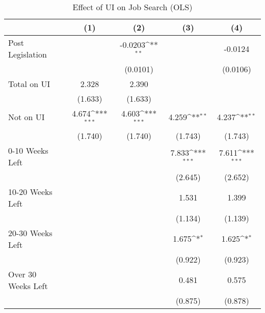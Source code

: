 \begin{table}[htbp]\centering
\def\sym#1{\ifmmode^{#1}\else\(^{#1}\)\fi}
\caption{Effect of UI on Job Search (OLS)\label{tab:olsregs}}
\begin{tabular}{l*{4}{c}}
\hline\hline
                    &\multicolumn{1}{c}{(1)}         &\multicolumn{1}{c}{(2)}         &\multicolumn{1}{c}{(3)}         &\multicolumn{1}{c}{(4)}         \\
\hline
Post Legislation    &                     &     -0.0203\sym{**} &                     &     -0.0124         \\
                    &                     &    (0.0101)         &                     &    (0.0106)         \\
[1em]
Total on UI         &       2.328         &       2.390         &                     &                     \\
                    &     (1.633)         &     (1.633)         &                     &                     \\
[1em]
Not on UI           &       4.674\sym{***}&       4.603\sym{***}&       4.259\sym{**} &       4.237\sym{**} \\
                    &     (1.740)         &     (1.740)         &     (1.743)         &     (1.743)         \\
[1em]
0-10 Weeks Left     &                     &                     &       7.833\sym{***}&       7.611\sym{***}\\
                    &                     &                     &     (2.645)         &     (2.652)         \\
[1em]
10-20 Weeks Left    &                     &                     &       1.531         &       1.399         \\
                    &                     &                     &     (1.134)         &     (1.139)         \\
[1em]
20-30 Weeks Left    &                     &                     &       1.675\sym{*}  &       1.625\sym{*}  \\
                    &                     &                     &     (0.922)         &     (0.923)         \\
[1em]
Over 30 Weeks Left  &                     &                     &       0.481         &       0.575         \\
                    &                     &                     &     (0.875)         &     (0.878)         \\

\end{tabular}
\end{table}
